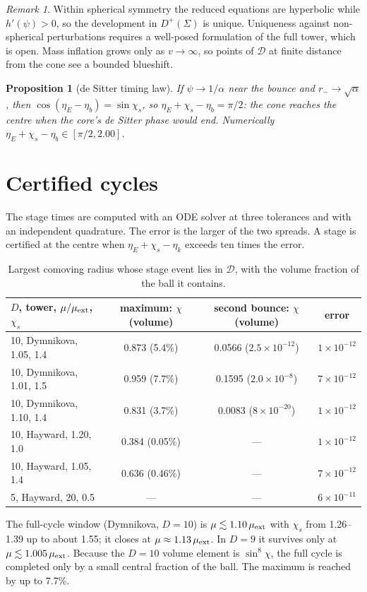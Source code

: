 \documentclass[11pt,a4paper]{article}
\newtheorem{proposition}[theorem]{Proposition}
\theoremstyle{definition}\newtheorem{definition}[theorem]{Definition}
\theoremstyle{remark}\newtheorem{remark}[theorem]{Remark}
\begin{document}
\begin{remark}
Within spherical symmetry the reduced equations are hyperbolic while $h'(\psi)>0$, so the development in $D^+(\Sigma)$ is unique.
Uniqueness against non-spherical perturbations requires a well-posed formulation of the full tower, which is open. Mass inflation grows
only as $v\to\infty$, so points of $\mathcal D$ at finite distance from the cone see a bounded blueshift.
\end{remark}

\begin{proposition}[de Sitter timing law]
If $\psi\to1/\alpha$ near the bounce and $r_-\to\sqrt\alpha$, then $\cos(\eta_E-\eta_b)=\sin\chi_s$, so
$\eta_E+\chi_s-\eta_b=\pi/2$: the cone reaches the centre when the core's de Sitter phase would end. Numerically
$\eta_E+\chi_s-\eta_b\in[\pi/2,2.00]$.
\end{proposition}

\section{Certified cycles}
The stage times are computed with an ODE solver at three tolerances and with an independent quadrature. The error is the larger of the
two spreads. A stage is certified at the centre when $\eta_E+\chi_s-\eta_k$ exceeds ten times the error.
\begin{table}[h]\centering\small
\begin{tabular}{lccc}\toprule
$D$, tower, $\mu/\mu_{\rm ext}$, $\chi_s$ & maximum: $\chi$ (volume) & second bounce: $\chi$ (volume) & error\\\midrule
10, Dymnikova, 1.05, 1.4 & 0.873 (5.4\%) & 0.0566 ($2.5\times10^{-12}$) & $1\times10^{-12}$\\
10, Dymnikova, 1.01, 1.5 & 0.959 (7.7\%) & 0.1595 ($2.0\times10^{-8}$) & $7\times10^{-12}$\\
10, Dymnikova, 1.10, 1.4 & 0.831 (3.7\%) & 0.0083 ($8\times10^{-20}$) & $1\times10^{-12}$\\
10, Hayward, 1.20, 1.0 & 0.384 (0.05\%) & --- & $1\times10^{-12}$\\
10, Hayward, 1.05, 1.4 & 0.636 (0.46\%) & --- & $7\times10^{-12}$\\
5, Hayward, 20, 0.5 & --- & --- & $6\times10^{-11}$\\\bottomrule
\end{tabular}
\caption{Largest comoving radius whose stage event lies in $\mathcal D$, with the volume fraction of the ball it contains.}
\end{table}
The full-cycle window (Dymnikova, $D=10$) is $\mu\lesssim1.10\,\mu_{\rm ext}$ with $\chi_s$ from 1.26--1.39 up to about 1.55; it closes
at $\mu\approx1.13\,\mu_{\rm ext}$. In $D=9$ it survives only at $\mu\lesssim1.005\,\mu_{\rm ext}$. Because the $D=10$ volume element is
$\sin^8\!\chi$, the full cycle is completed only by a small central fraction of the ball. The maximum is reached by up to 7.7\%.
\end{document}
